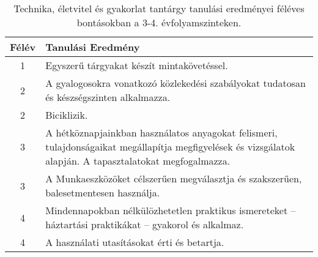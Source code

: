        
           \begin{longtable}{c | p{12cm} }
            \caption[Technika, életvitel és gyakorlat 3-4.]{Technika, életvitel és gyakorlat tantárgy tanulási eredményei féléves bontásokban a 3-4. évfolyamszinteken. }  \\

            \textbf{Félév} & \textbf{Tanulási Eredmény} \\
            \hline
            \endhead
                                
                                          1 &  Egyszerű tárgyakat készít mintakövetéssel. \\ \hline
                                      
                                
                                          2 &  A gyalogosokra vonatkozó közlekedési szabályokat tudatosan és készségszinten alkalmazza. \\ \hline
                                          2 &  Biciklizik. \\ \hline
                                      
                                
                                          3 &  A hétköznapjainkban használatos anyagokat felismeri, tulajdonságaikat megállapítja megfigyelések és vizsgálatok alapján. A tapasztalatokat megfogalmazza. \\ \hline
                                          3 &  A Munkaeszközöket célszerűen megválasztja és szakszerűen, balesetmentesen használja. \\ \hline
                                      
                                
                                          4 &  Mindennapokban nélkülözhetetlen praktikus ismereteket – háztartási praktikákat – gyakorol és alkalmaz. \\ \hline
                                          4 &  A használati utasításokat érti és betartja. \\ \hline
                                      
                        \end{longtable}
            \clearpage

